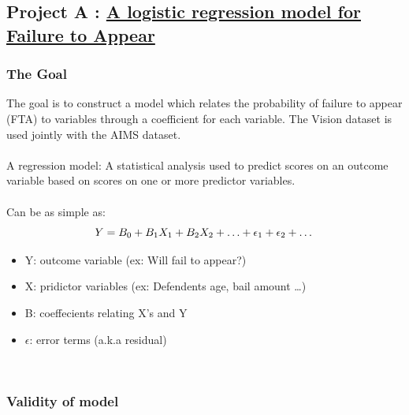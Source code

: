 \documentclass{article}
\begin{document}
\subsection{Project A : \underline{A logistic regression model for Failure to Appear}}
\subsubsection{The Goal}
The goal is to construct a model which relates the probability of failure to appear (FTA) to variables through a coefficient for each variable. The Vision dataset is used jointly with the AIMS dataset. 
~\\
~\\
A regression model: A statistical analysis used to predict scores on an outcome
variable based on scores on one or more predictor variables.\\
~\\
Can be as simple as:
\begin{equation}
Y = B_{0} + B_{1}X_{1} + B_{2}X_{2} + \ldots + \epsilon_{1}+\epsilon_{2} + \ldots \\
\end{equation}
\begin{itemize}
\item Y: outcome variable (ex: Will fail to appear?)
\item X: pridictor variables (ex: Defendents age, bail amount \ldots)
\item B: coeffecients relating X's and Y
\item $\epsilon$: error terms (a.k.a residual)
\end{itemize}
~\\


\subsubsection{Validity of model}
\end{document}
